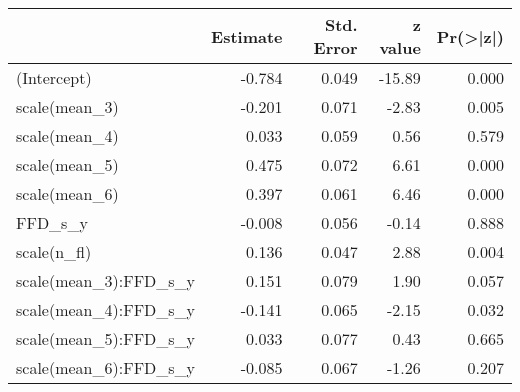 \documentclass[
]{article}
\newenvironment{Shaded}{\begin{snugshade}}{\end{snugshade}}
\newcommand{\DataTypeTok}[1]{\textcolor[rgb]{0.13,0.29,0.53}{#1}}
\newcommand{\DecValTok}[1]{\textcolor[rgb]{0.00,0.00,0.81}{#1}}
\newcommand{\KeywordTok}[1]{\textcolor[rgb]{0.13,0.29,0.53}{\textbf{#1}}}
\newcommand{\NormalTok}[1]{#1}
\newcommand{\OperatorTok}[1]{\textcolor[rgb]{0.81,0.36,0.00}{\textbf{#1}}}
\begin{document}
\begin{table}

\centering
\begin{tabular}[t]{l|r|r|r|r}
\hline
  & Estimate & Std. Error & z value & Pr(>|z|)\\
\hline
(Intercept) & -0.784 & 0.049 & -15.89 & 0.000\\
\hline
scale(mean\_3) & -0.201 & 0.071 & -2.83 & 0.005\\
\hline
scale(mean\_4) & 0.033 & 0.059 & 0.56 & 0.579\\
\hline
scale(mean\_5) & 0.475 & 0.072 & 6.61 & 0.000\\
\hline
scale(mean\_6) & 0.397 & 0.061 & 6.46 & 0.000\\
\hline
FFD\_s\_y & -0.008 & 0.056 & -0.14 & 0.888\\
\hline
scale(n\_fl) & 0.136 & 0.047 & 2.88 & 0.004\\
\hline
scale(mean\_3):FFD\_s\_y & 0.151 & 0.079 & 1.90 & 0.057\\
\hline
scale(mean\_4):FFD\_s\_y & -0.141 & 0.065 & -2.15 & 0.032\\
\hline
scale(mean\_5):FFD\_s\_y & 0.033 & 0.077 & 0.43 & 0.665\\
\hline
scale(mean\_6):FFD\_s\_y & -0.085 & 0.067 & -1.26 & 0.207\\
\hline
\end{tabular}
\centering
\begin{tabular}[t]{}
\hline

\hline
\end{tabular}
\centering
\begin{tabular}[t]{}
\hline

\hline
\end{tabular}
\end{table}

\begin{Shaded}
\end{Shaded}
\end{document}
